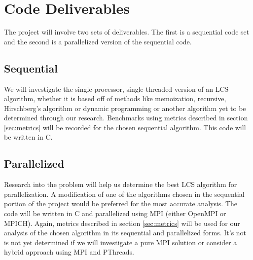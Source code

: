 \section{Code Deliverables}
The project will involve two sets of deliverables. The first is a sequential code set and the second is a parallelized version of the sequential code.
\subsection{Sequential}
We will investigate the single-processor, single-threaded version of an LCS algorithm, whether it is based off of methods like memoization, recursive, Hirschberg's algorithm or dynamic programming or another algorithm yet to be determined through our research. Benchmarks using metrics described in section \ref{sec:metrics} will be recorded for the chosen sequential algorithm. This code will be written in C.

\subsection{Parallelized}
Research into the problem will help us determine the best LCS algorithm for parallelization. A modification of one of the algorithms chosen in the sequential portion of the project would be preferred for the most accurate analysis. The code will be written in C and parallelized using MPI (either OpenMPI or MPICH). Again, metrics described in section \ref{sec:metrics} will be used for our analysis of the chosen algorithm in its sequential and parallelized forms. It's not is not yet determined if we will investigate a pure MPI solution or consider a hybrid approach using MPI and PThreads.
